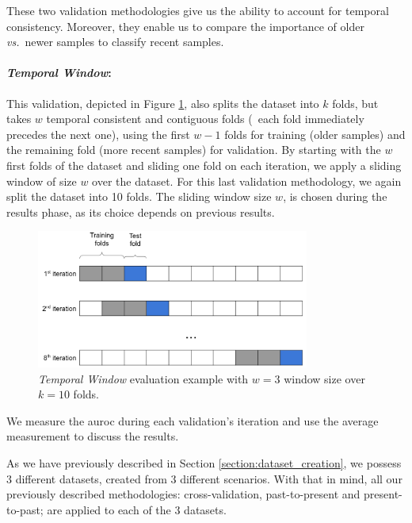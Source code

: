 These two validation methodologies give us the ability to account for temporal consistency.
Moreover, they enable us to compare the importance of older \textit{vs.}\ newer samples to classify recent samples.

\paragraph{\textit{Temporal Window}:} This validation, depicted in Figure \ref{fig:sliding_window}, also splits the dataset into $k$ folds, but takes $w$ temporal consistent and contiguous folds (\ie\ each fold immediately precedes the next one), using the first $w-1$ folds for training (older samples) and the remaining fold (more recent samples) for validation.
By starting with the $w$ first folds of the dataset and sliding one fold on each iteration, we apply a sliding window of size $w$ over the dataset.
For this last validation methodology, we again split the dataset into 10 folds.
The sliding window size $w$, is chosen during the results phase, as its choice depends on previous results.

\begin{figure}[!htb]
	\centering
	\includegraphics[width=0.8\textwidth]{Figures/dia_slidingwindow.png}
	\caption[\textit{Temporal Window} evaluation example.]{\textit{Temporal Window} evaluation example with $w=3$ window size over $k=10$ folds.}
	\label{fig:sliding_window}
\end{figure}

\medskip

We measure the \gls{auroc} during each validation's iteration and use the average measurement to discuss the results.

As we have previously described in Section \ref{section:dataset_creation}, we possess 3 different datasets, created from 3 different scenarios.
With that in mind, all our previously described methodologies: cross-validation, past-to-present and present-to-past; are applied to each of the 3 datasets.

